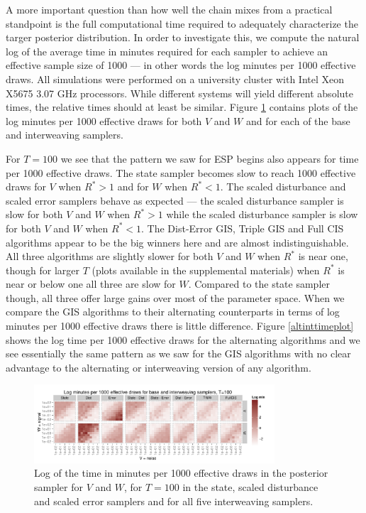 \documentclass{article}
\begin{document}
A more important question than how well the chain mixes from a practical standpoint is the full computational time required to adequately characterize the targer posterior distribution. In order to investigate this, we compute the natural log of the average time in minutes required for each sampler to achieve an effective sample size of 1000 --- in other words the log minutes per 1000 effective draws. All simulations were performed on a university cluster with Intel Xeon X5675 3.07 GHz processors. While different systems will yield different absolute times, the relative times should at least be similar. Figure \ref{baseinttimeplot} contains plots of the log minutes per 1000 effective draws for both $V$ and $W$ and for each of the base and interweaving samplers.

For $T=100$ we see that the pattern we saw for ESP begins also appears for time per 1000 effective draws. The state sampler becomes slow to reach 1000 effective draws for $V$ when $R^*>1$ and for $W$ when $R^*<1$. The scaled disturbance and scaled error samplers behave as expected --- the scaled disturbance sampler is slow for both $V$ and $W$ when $R^*>1$ while the scaled disturbance sampler is slow for both $V$ and $W$ when $R^*<1$. The Dist-Error GIS, Triple GIS and Full CIS algorithms appear to be the big winners here and are almost indistinguishable. All three algorithms are slightly slower for both $V$ and $W$ when $R^*$ is near one, though for larger $T$ (plots available in the supplemental materials) when $R^*$ is near or below one all three are slow for $W$. Compared to the state sampler though, all three offer large gains over most of the parameter space. When we compare the GIS algorithms to their alternating counterparts in terms of log minutes per 1000 effective draws there is little difference. Figure \ref{altinttimeplot} shows the log time per 1000 effective draws for the alternating algorithms and we see essentially the same pattern as we saw for the GIS algorithms with no clear advantage to the alternating or interweaving version of any algorithm.


\begin{figure}[!ht]
\centering
\includegraphics[width=0.8\textwidth]{baseinttimeplot1}
\caption{Log of the time in minutes per 1000 effective draws in the posterior sampler for $V$ and $W$, for $T=100$ in the state, scaled disturbance and scaled error samplers and for all five interweaving samplers.}
\label{baseinttimeplot}
\end{figure}
\end{document}
